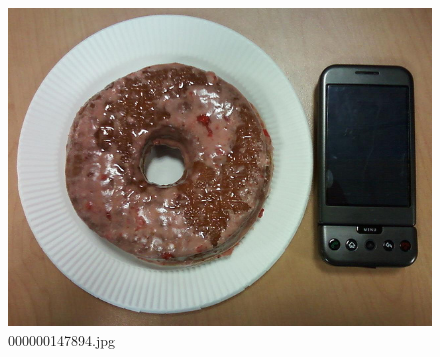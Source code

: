     \begin{figure}[h]
        \centering
        \includegraphics[width=0.8\linewidth]{../image set/easy/000000147894.jpg}
        \caption{000000147894.jpg}
    \end{figure}
